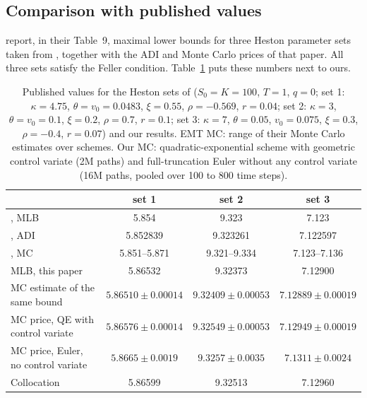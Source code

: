 \subsection{Comparison with published values}\label{sec:published}

\citet{FusaiKyriakou2016} report, in their Table~9, maximal lower bounds for three Heston parameter sets
taken from \citet{EwaldMenkensTing2013}, together with the ADI and Monte Carlo prices of that paper. All
three sets satisfy the Feller condition. Table~\ref{tab:published} puts these numbers next to ours.

\begin{table}[t]
\centering
\caption{Published values for the Heston sets of \citet[Table~1]{EwaldMenkensTing2013}
($S_0=K=100$, $T=1$, $q=0$; set 1: $\kappa=4.75$, $\theta=v_0=0.0483$, $\xi=0.55$, $\rho=-0.569$, $r=0.04$;
set 2: $\kappa=3$, $\theta=v_0=0.1$, $\xi=0.2$, $\rho=0.7$, $r=0.1$; set 3: $\kappa=7$, $\theta=0.05$,
$v_0=0.075$, $\xi=0.3$, $\rho=-0.4$, $r=0.07$) and our results. EMT MC: range of their Monte Carlo
estimates over schemes. Our MC: quadratic-exponential scheme with geometric control variate (2M paths)
and full-truncation Euler without any control variate (16M paths, pooled over 100 to 800 time steps).}
\label{tab:published}
\small
\begin{tabular}{lccc}
\toprule
& set 1 & set 2 & set 3\\
\midrule
\citet{FusaiKyriakou2016}, MLB & 5.854 & 9.323 & 7.123\\
\citet{EwaldMenkensTing2013}, ADI & 5.852839 & 9.323261 & 7.122597\\
\citet{EwaldMenkensTing2013}, MC & 5.851--5.871 & 9.321--9.334 & 7.123--7.136\\
\midrule
MLB, this paper & 5.86532 & 9.32373 & 7.12900\\
MC estimate of the same bound & $5.86510\pm0.00014$ & $9.32409\pm0.00053$ & $7.12889\pm0.00019$\\
MC price, QE with control variate & $5.86576\pm0.00014$ & $9.32549\pm0.00053$ & $7.12949\pm0.00019$\\
MC price, Euler, no control variate & $5.8665\pm0.0019$ & $9.3257\pm0.0035$ & $7.1311\pm0.0024$\\
Collocation & 5.86599 & 9.32513 & 7.12960\\
\bottomrule
\end{tabular}
\end{table}

